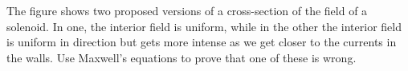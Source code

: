 The figure shows two proposed versions of
a cross-section of the field of a solenoid.
In one, the interior field is uniform, while in the
other the interior field is uniform in direction but gets more
intense as we get closer to the currents in the walls.
Use Maxwell's equations to prove that one of these is wrong.

